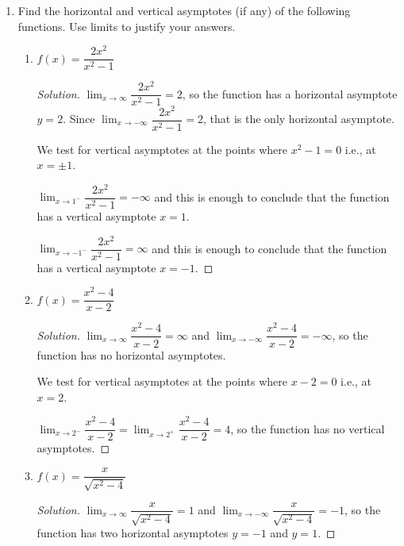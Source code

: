 \documentclass[12pt]{article}
\newenvironment{solution}{\begin{proof}[Solution]}{\end{proof}}
\begin{document}
\begin{enumerate}
\begin{enumerate}
			\item $\displaystyle{\lim_{x\to 2^-} \dfrac{x^2-5x+6}{x^2-4x+4}}$
			\begin{solution}
				$\displaystyle{\lim_{x\to 2^-} \dfrac{x^2-5x+6}{x^2-4x+4}}=\displaystyle{\lim_{x\to2^-}\dfrac{(x-2)(x-3)}{(x-2)^2}}=\displaystyle{\lim_{x\to2^-} \dfrac{x-3}{x-2}}=\infty$
			\end{solution}
				\item $\displaystyle{\lim_{x\to-2^+} \dfrac{x^2-4}{x+2}}$
			\begin{solution}
				$\displaystyle{\lim_{x\to-2^+} \dfrac{x^2-4}{x+2}}=\displaystyle{\lim_{x\to-2^+} \dfrac{(x-2)(x+2)}{x+2}}=\displaystyle{\lim_{x\to\-2^+} (x-2)}=-4$
			\end{solution}
		\end{enumerate}
		\item Find the horizontal and vertical asymptotes (if any) of the following functions. Use limits to justify your answers.
		
		\begin{enumerate}
			\item $f(x)=\dfrac{2x^2}{x^2-1}$
			\begin{solution}
				$\displaystyle{\lim_{x\to\infty} \dfrac{2x^2}{x^2-1}}=2$, so the function has a horizontal asymptote $y=2$. Since $\displaystyle{\lim_{x\to-\infty} \dfrac{2x^2}{x^2-1}}=2$, that is the only horizontal asymptote.
				
				We test for vertical asymptotes at the points where $x^2-1=0$ i.e., at $x=\pm 1$.
				
				$\displaystyle{\lim_{x\to1^-} \dfrac{2x^2}{x^2-1}}=-\infty$ and this is enough to conclude that the function has a vertical asymptote $x=1$.
				
				$\displaystyle{\lim_{x\to -1^-} \dfrac{2x^2}{x^2-1}}=\infty$ and this is enough to conclude that the function has a vertical asymptote $x=-1$.
			\end{solution}
			\item $f(x)=\dfrac{x^2-4}{x-2}$
			\begin{solution}
				$\displaystyle{\lim_{x\to\infty} \dfrac{x^2-4}{x-2}}=\infty$ and $\displaystyle{\lim_{x\to-\infty} \dfrac{x^2-4}{x-2}}=-\infty$, so the function has no horizontal asymptotes. 
				
				We test for vertical asymptotes at the points where $x-2=0$ i.e., at $x=2$.
				
				$\displaystyle{\lim_{x\to2^-} \dfrac{x^2-4}{x-2}}=\displaystyle{\lim_{x\to2^+} \dfrac{x^2-4}{x-2}}=4$, so the function has no vertical asymptotes.
			\end{solution}
			\item $f(x)=\dfrac{x}{\sqrt{x^2-4}}$
			\begin{solution}
				$\displaystyle{\lim_{x\to\infty} \dfrac{x}{\sqrt{x^2-4}}}=1$ and $\displaystyle{\lim_{x\to-\infty} \dfrac{x}{\sqrt{x^2-4}}}=-1$, so the function has two horizontal asymptotes $y=-1$ and $y=1$.
				

\end{solution}
\end{enumerate}
\end{enumerate}
\end{document}
